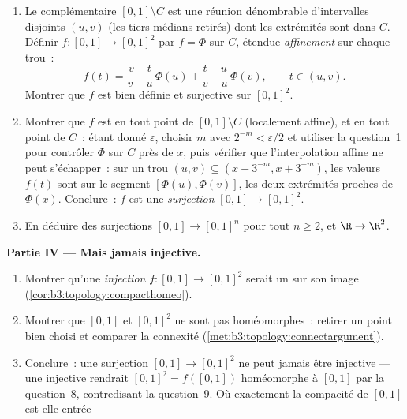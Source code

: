 \begin{problem}
\begin{enumerate}[resume]
  \item Le complémentaire $[0,1] \setminus C$ est une réunion
        dénombrable d'intervalles  disjoints $(u, v)$
        (les tiers médians retirés) dont les extrémités sont
        dans $C$. Définir $f \colon [0,1] \to [0,1]^2$ par $f =
        \Phi$ sur $C$, étendue \emph{affinement} sur chaque
        trou~:
        \[
        f(t) = \frac{v - t}{v - u}\,\Phi(u) +
        \frac{t - u}{v - u}\,\Phi(v),
        \qquad t \in (u, v).
        \]
        Montrer que $f$ est bien définie et surjective sur
        $[0,1]^2$.
  \item Montrer que $f$ est  en tout point de $[0,1]
        \setminus C$ (localement affine), et en tout point de
        $C$~: étant donné $\varepsilon$, choisir $m$ avec
        $2^{-m} < \varepsilon/2$ et utiliser la question~1 pour
        contrôler $\Phi$ sur $C$ près de $x$, puis vérifier que
        l'interpolation affine ne peut s'échapper~: sur un trou
        $(u,v) \subseteq (x - 3^{-m}, x + 3^{-m})$, les valeurs
        $f(t)$ sont sur le segment $[\Phi(u), \Phi(v)]$, les
        deux extrémités proches de $\Phi(x)$. Conclure~: $f$
        est une \emph{surjection } $[0,1] \to [0,1]^2$.
  \item En déduire des surjections  $[0,1] \to [0,1]^n$ pour tout $n \geq 2$, et $\R \to \R^2$.
\end{enumerate}
\medskip
\noindent\textbf{Partie IV --- Mais jamais injective.}
\begin{enumerate}[resume]
  \item Montrer qu'une \emph{injection}  $f \colon
        [0,1] \to [0,1]^2$ serait un  sur son
        image (\cref{cor:b3:topology:compacthomeo}).
  \item Montrer que $[0,1]$ et $[0,1]^2$ ne sont pas
        homéomorphes~: retirer un point bien choisi et
        comparer la connexité
        (\cref{met:b3:topology:connectargument}).
  \item Conclure~: une surjection  $[0,1] \to [0,1]^2$
        ne peut jamais être injective --- une injective
        rendrait $[0,1]^2 = f([0,1])$ homéomorphe à $[0,1]$ par
        la question~8, contredisant la question~9. Où
        exactement la compacité de $[0,1]$ est-elle entrée

\end{enumerate}
\end{problem}
